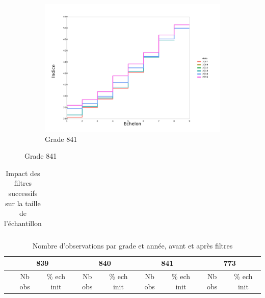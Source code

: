 \documentclass[11pt,a4paper]{article}
\begin{document}
\begin{figure}[ht]
\begin{subfigure}[b]{0.33\linewidth}
  \end{subfigure}%
  \begin{subfigure}[b]{0.33\linewidth}
        \caption{Grade 841} 
    \label{echelon_by_neg_841} 
    \centering
    \includegraphics[width=1\linewidth]{AS_841_grille_by_neg.pdf} 
  \end{subfigure}%

\end{figure}



\begin{table}[h!]
\centering
\caption{Impact des filtres successifs sur la taille de l'échantillon} 
\label{filters_AS}
\begin{tabular}{lcc}
\toprule

\bottomrule
\end{tabular}
\end{table}


\begin{table}[h!]
\centering
\caption{Nombre d'observations par grade et année, avant et après filtres} 
\label{count_AS}
\begin{tabular}{lcc|cc|cc|cc}
\toprule
 & \multicolumn{2}{c}{839} & \multicolumn{2}{c}{840} & 		  	   \multicolumn{2}{c}{841} & \multicolumn{2}{c}{773} \\
 \midrule
 & Nb obs & \% ech init  & Nb obs & \% ech init & Nb obs & \% ech init & Nb obs & \% ech init  \\

\bottomrule
\end{tabular}
\end{table}
\end{document}
